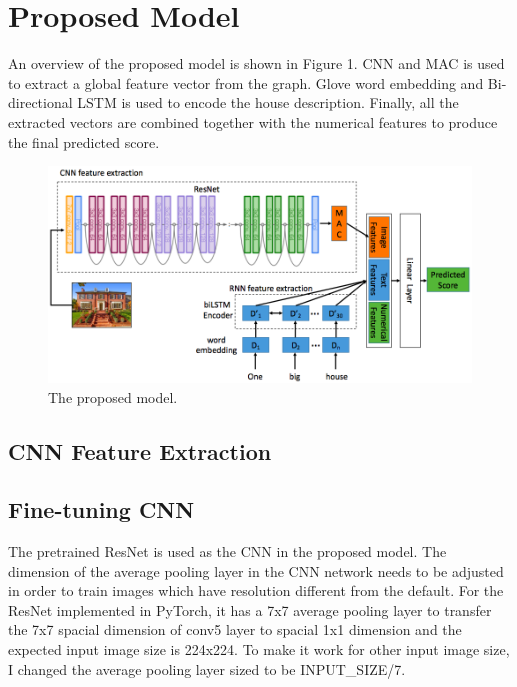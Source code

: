 \documentclass{article} %
\begin{document}
\section{Proposed Model}

An overview of the proposed model is shown in Figure 1.
CNN and MAC is used to extract a global feature vector from the graph.
Glove word embedding and Bi-directional LSTM is used to encode the house description.
Finally, all the extracted vectors are combined together with
the numerical features to produce the final predicted score.

\begin{figure}[h]
	\begin{center}
		\includegraphics[width=1.0\linewidth]{fig/model.png}
	\end{center}
	\caption{The proposed model.}
\end{figure}

\subsection{CNN Feature Extraction}

\subsection{Fine-tuning CNN}

The pretrained ResNet\cite{he2016deep} is used as the CNN in the proposed model.
The dimension of the average pooling layer in the CNN network needs to be adjusted
in order to train images which have resolution different from the default.
For the ResNet implemented in PyTorch, it has a 7x7 average pooling layer
to transfer the 7x7 spacial dimension of conv5 layer to spacial 1x1 dimension
and the expected input image size is 224x224.
To make it work for other input image size, I changed the average pooling layer sized to be INPUT\_SIZE/7.
\end{document}
